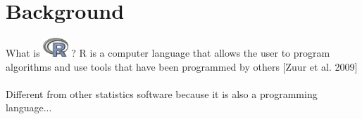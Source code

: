\documentclass[xcolor=svgnames]{beamer}
\begin{document}
\section{Background}

\begin{frame}{What is \includegraphics[width=0.07\textwidth]{Rlogo.jpg} \hspace{0.2em}? }
R is a computer language that allows the user to program algorithms and use tools that
have been programmed by others [Zuur et al. 2009]\\~\\
Different from other statistics software because it is also a programming language...

\end{frame}
\end{document}

